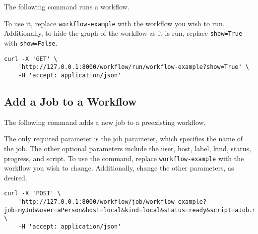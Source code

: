 The following command runs a workflow.

To use it, replace \texttt{workflow-example} with the workflow you wish
to run. Additionally, to hide the graph of the workflow as it is run,
replace \texttt{show=True} with \texttt{show=False}.

\begin{verbatim}
curl -X 'GET' \
    'http://127.0.0.1:8000/workflow/run/workflow-example?show=True' \
    -H 'accept: application/json'
\end{verbatim}

\subsection{Add a Job to a Workflow}\label{add-a-job-to-a-workflow}

The following command adds a new job to a preexisting workflow.

The only required parameter is the job parameter, which specifies the
name of the job. The other optional parameters include the user, host,
label, kind, status, progress, and script. To use the command, replace
\texttt{workflow-example} with the workflow you wish to change.
Additionally, change the other parameters, as desired.

\begin{verbatim}
curl -X 'POST' \
    'http://127.0.0.1:8000/workflow/job/workflow-example?job=myJob&user=aPerson&host=local&kind=local&status=ready&script=aJob.sh&progress=0&label=aLabel' \
    -H 'accept: application/json'
\end{verbatim}
